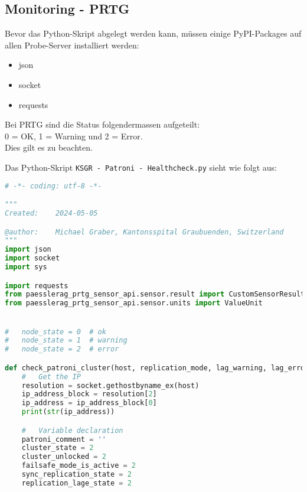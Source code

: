
\clearpage
\begin{flushleft}
    \section{Monitoring - \Gls{PRTG}}
    \label{sec:monitoring}
    Bevor das Python-Skript abgelegt werden kann, müssen einige PyPI-Packages auf allen Probe-Server installiert werden:
    \begin{itemize}
        \item json
        \item socket
        \item requests
    \end{itemize}
\end{flushleft}
\begin{flushleft}
    \begin{warning}
        Bei \Gls{PRTG} sind die Status folgendermassen aufgeteilt:\\
        0 = OK, 1 = Warning und 2 = Error.\\
        Dies gilt es zu beachten.
    \end{warning}
    Das Python-Skript \texttt{KSGR - Patroni - Healthcheck.py} sieht wie folgt aus:
    \lstset{style=gra_codestyle}
    \begin{lstlisting}[language=python, caption=Monitoring - KSGR - Patroni - Healthcheck.py,captionpos=b,label={lst:monitoring-python},breaklines=true]
# -*- coding: utf-8 -*-

"""
Created:    2024-05-05

@author:    Michael Graber, Kantonsspital Graubuenden, Switzerland
"""
import json
import socket
import sys

import requests
from paesslerag_prtg_sensor_api.sensor.result import CustomSensorResult
from paesslerag_prtg_sensor_api.sensor.units import ValueUnit


#   node_state = 0  # ok
#   node_state = 1  # warning
#   node_state = 2  # error

def check_patroni_cluster(host, replication_mode, lag_warning, lag_error):
    #   Get the IP
    resolution = socket.gethostbyname_ex(host)
    ip_address_block = resolution[2]
    ip_address = ip_address_block[0]
    print(str(ip_address))

    #   Variable declaration
    patroni_comment = ''
    cluster_state = 2
    cluster_unlocked = 2
    failsafe_mode_is_active = 2
    sync_replication_state = 2
    replication_lage_state = 2


\end{lstlisting}
\end{flushleft}
